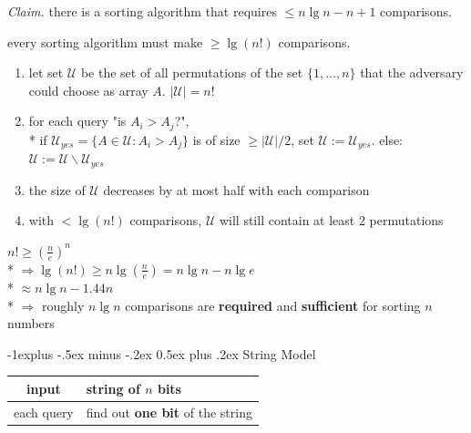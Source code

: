 \documentclass[10pt, landscape]{article}
\makeatletter
\renewcommand{\subsection}{\@startsection{subsection}{2}{0mm}%
  {-1explus -.5ex minus -.2ex}%
  {0.5ex plus .2ex}%
{\normalfont\normalsize\bfseries}}
\makeatother
\begin{document}
\begin{multicols*}{4}
  \textit{Claim.} there is a sorting algorithm that requires $\leq n \lg n - n + 1$ comparisons.

  \begin{niceproof}
    every sorting algorithm must make $\geq \lg (n!)$ comparisons.
  \end{niceproof}

  \begin{enumerate}
    \item let set $\mathcal{U}$ be the set of all permutations of the set $\{1, \dots, n\}$ that the adversary could choose as array $A$. $\vert \mathcal{U} \vert = n!$ 
    \item for each query "is $A_i > A_j$?", 
      \\* if $\mathcal{U}_{yes} = \{A \in \mathcal{U} : A_i > A_j\}$ is of size $\geq \vert\mathcal{U}\vert /2$, set $\mathcal{U} := \mathcal{U}_{yes}$. else: $\mathcal{U} := \mathcal{U} \backslash \mathcal{U}_{yes}$
    \item the size of $\mathcal{U}$ decreases by at most half with each comparison
    \item with $< \lg (n!)$ comparisons, $\mathcal{U}$ will still contain at least 2 permutations
  \end{enumerate}

  \begin{tightcenter}
    $n! \geq (\frac{n}{e})^n$ 
    \\* $\Rightarrow \lg (n!) \geq n \lg (\frac{n}{e}) = n \lg n - n \lg e$
    \\* $\approx n \lg n - 1.44n$
    \\* $\Rightarrow$ roughly $n \lg n$ comparisons are \textbf{required} and \textbf{sufficient} for sorting $n$ numbers
  \end{tightcenter}

  \subsection{String Model}

  \begin{tightcenter}
    \begin{tabular}{|c|l|}
      \hline
      input & string of $n$ bits \\\hline
      each query & find out \textbf{one bit} of the string \\ \hline
    \end{tabular}
  \end{tightcenter}


\end{multicols*}
\end{document}
